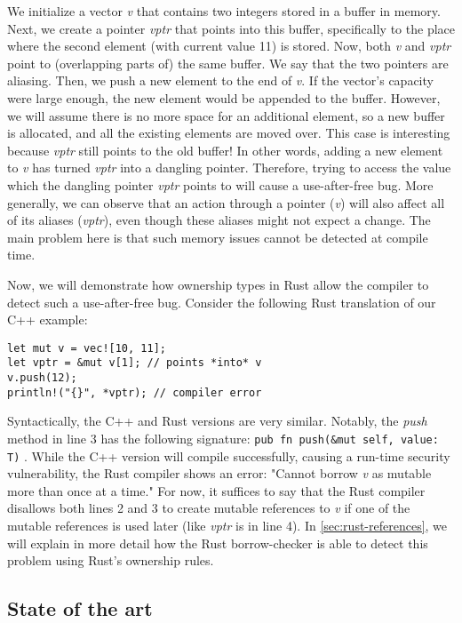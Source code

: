 \documentclass[sigplan,11pt,nonacm]{acmart}
\begin{document}
We initialize a vector \emph{v} that contains two integers stored in a buffer in memory.
Next, we create a pointer \emph{vptr} that points into this buffer, specifically to the place where the second element (with current value 11) is stored.
Now, both \emph{v} and \emph{vptr} point to (overlapping parts of) the same buffer.
We say that the two pointers are aliasing.
Then, we push a new element to the end of \emph{v}.
If the vector's capacity were large enough, the new element would be appended to the buffer.
However, we will assume there is no more space for an additional element, so a new buffer is allocated, and all the existing elements are moved over.
This case is interesting because \emph{vptr} still points to the old buffer!
In other words, adding a new element to \emph{v} has turned \emph{vptr} into a dangling pointer.
Therefore, trying to access the value which the dangling pointer \emph{vptr} points to will cause a use-after-free bug.
More generally, we can observe that an action through a pointer (\emph{v}) will also affect all of its aliases (\emph{vptr}), even though these aliases might not expect a change.
The main problem here is that such memory issues cannot be detected at compile time.

Now, we will demonstrate how ownership types in Rust allow the compiler to detect such a use-after-free bug.
Consider the following Rust translation of our C++ example:

\begin{lstlisting}
let mut v = vec![10, 11];
let vptr = &mut v[1]; // points *into* v
v.push(12);
println!("{}", *vptr); // compiler error
\end{lstlisting}

Syntactically, the C++ and Rust versions are very similar.
Notably, the \emph{push} method in line 3 has the following signature: \verb|pub fn push(&mut self, value: T)| \cite{rust-vector-documentation}.
While the C++ version will compile successfully, causing a run-time security vulnerability, the Rust compiler shows an error: "Cannot borrow \emph{v} as mutable more than once at a time."
For now, it suffices to say that the Rust compiler disallows both lines 2 and 3 to create mutable references to \emph{v} if one of the mutable references is used later (like \emph{vptr} is in line 4).
In \ref{sec:rust-references}, we will explain in more detail how the Rust borrow-checker is able to detect this problem using Rust's ownership rules.


\subsection{State of the art}
\label{sec:state-of-the-art}
\end{document}
